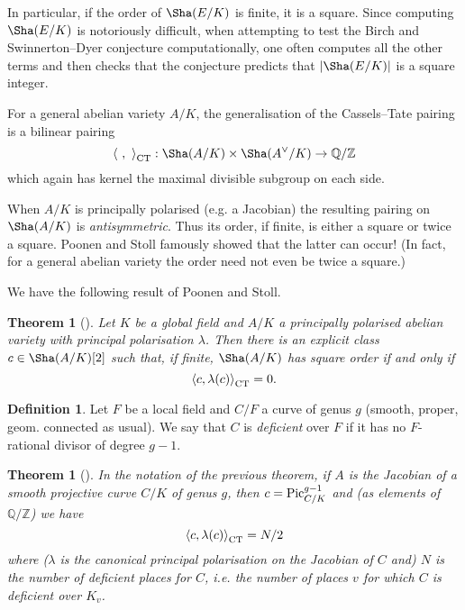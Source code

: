 \documentclass[12pt]{amsart}
\numberwithin{equation}{section}
\newtheorem{theorem}[equation]{Theorem}
\theoremstyle{remark}
\theoremstyle{definition}
\theoremstyle{definition}
\theoremstyle{definition}
\newtheorem{defi}[equation]{Definition}
\theoremstyle{definition}
\theoremstyle{definition}
\theoremstyle{definition}
\theoremstyle{definition}
\begin{document}
In particular, if the order of $\Sha(E/K)$ is finite, it is a square. Since computing $\Sha(E/K)$ is notoriously difficult, when attempting to test the Birch and Swinnerton--Dyer conjecture computationally, one often computes all the other terms and then checks that the conjecture predicts that $|\Sha(E/K)|$ is a square integer. 

For a general abelian variety $A/K$, the generalisation of the Cassels--Tate pairing is a bilinear pairing
\[\left \langle ~,~\right \rangle_{\textup{CT}}:\Sha(A/K)\times \Sha(A^\vee/K)\rightarrow \mathbb{Q}/\mathbb{Z}\]
which again has kernel the maximal divisible subgroup on each side. 

When $A/K$ is principally polarised (e.g. a Jacobian) the resulting pairing on $\Sha(A/K)$ is \textit{antisymmetric}. Thus its order, if finite, is either a square or twice a square. Poonen and Stoll famously showed that the latter can occur! (In fact, for a general abelian variety the order need not even be twice a square.)

We have the following result of Poonen and Stoll.

\begin{theorem}[{\cite[Theorem 8]{MR1740984}}]
Let $K$ be a global field  and $A/K$ a principally polarised abelian variety with principal polarisation $\lambda$. Then there is an explicit class $c\in \Sha(A/K)[2]$ such that, if finite, $\Sha(A/K)$ has square order if and only if 
\[\left \langle c,\lambda(c)\right \rangle_{\textup{CT}}=0.\]
\end{theorem}

\begin{defi}
Let $F$ be a local field and $C/F$ a curve of genus $g$ (smooth, proper, geom. connected as usual). We say that $C$ is \emph{deficient} over $F$ if it has no $F$-rational divisor of degree $g-1$.
\end{defi}

\begin{theorem}[{\cite[Corollary 12]{MR1740984}}]
In the notation of the previous theorem, if $A$ is the Jacobian of a smooth projective curve $C/K$ of genus $g$, then $c=\textup{Pic}^{g-1}_{C/K}$ and (as elements of $\mathbb{Q}/\mathbb{Z}$) we have
\[ \left \langle c,\lambda(c)\right \rangle_{\textup{CT}}=N/2\]
where ($\lambda$ is the canonical principal polarisation on the Jacobian of $C$ and) $N$ is the number of \emph{deficient places} for $C$, i.e. the number of places $v$ for which $C$ is deficient over $K_v$.
\end{theorem}
\end{document}
